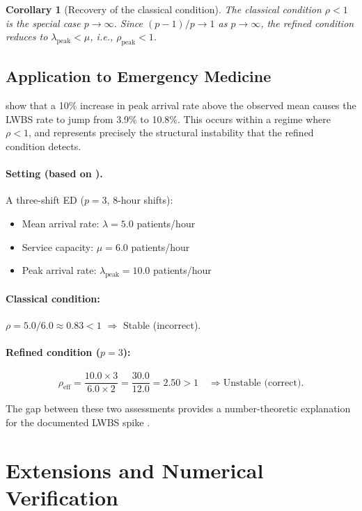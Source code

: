 \documentclass[12pt]{article}
\newtheorem{corollary}[theorem]{Corollary}
\newcommand{\rhoeff}{\rho_{\mathrm{eff}}}
\newcommand{\lpeak}{\lambda_{\mathrm{peak}}}
\begin{document}
\begin{corollary}[Recovery of the classical condition]
\label{cor:unification}
  The classical condition $\rho < 1$ is the special case $p \to \infty$.
  Since $(p-1)/p \to 1$ as $p \to \infty$, the refined condition reduces 
  to $\lpeak < \mu$, i.e., $\rho_{\mathrm{peak}} < 1$.
\end{corollary}

\subsection{Application to Emergency Medicine}

\citet{Wiler2013} show that a 10\% increase in peak arrival rate above 
the observed mean causes the LWBS rate to jump from 3.9\% to 10.8\%.
This occurs within a regime where $\rho < 1$, and represents precisely 
the structural instability that the refined condition detects.

\paragraph{Setting (based on \citealt{Green2006}).}
A three-shift ED ($p=3$, 8-hour shifts):
\begin{itemize}
  \item Mean arrival rate: $\lambda = 5.0$ patients/hour
  \item Service capacity: $\mu = 6.0$ patients/hour
  \item Peak arrival rate: $\lpeak = 10.0$ patients/hour
\end{itemize}

\paragraph{Classical condition:}
$\rho = 5.0/6.0 \approx 0.83 < 1$ \quad $\Rightarrow$ Stable (incorrect).

\paragraph{Refined condition ($p=3$):}
\[
  \rhoeff = \frac{10.0 \times 3}{6.0 \times 2} = \frac{30.0}{12.0} 
          = 2.50 > 1 \quad \Rightarrow \text{Unstable (correct).}
\]

The gap between these two assessments provides a number-theoretic 
explanation for the documented LWBS spike \citep{Wiler2013}.

\section{Extensions and Numerical Verification}
\end{document}
